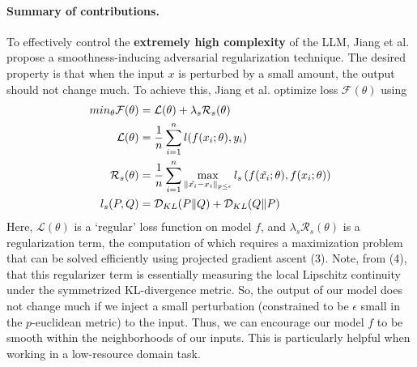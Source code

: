 \documentclass{article}
\begin{document}
\paragraph{Summary of contributions.}
To effectively control the \textbf{extremely high complexity} of the LLM, Jiang et al. \cite{smart} propose a smoothness-inducing adversarial regularization technique. The desired property is that when the input $x$ is perturbed by a small amount, the output should not change much. To achieve this, Jiang et al. \cite{smart} optimize loss $\mathcal{F}(\theta)$ using
\begin{align}
    min_{\theta} \mathcal{F}(\theta) & = \mathcal{L}(\theta) + \lambda_{s}\mathcal{R}_{s}(\theta) \\
    \mathcal{L}(\theta) & = \frac{1}{n} \sum_{i=1}^{n} l(f(x_{i};\theta), y_{i}) \\
    \mathcal{R}_{s}(\theta) & = \frac{1}{n} \sum_{i=1}^{n} \max_{\lVert \Tilde{x_{i}} - x_{i} \rVert_{p \leq \epsilon}} l_{s}\left(f(\Tilde{x_{i}}; \theta), f(x_{i}; \theta)\right) \\
    l_{s}(P, Q) & = \mathcal{D}_{KL}(P \lVert Q) + \mathcal{D}_{KL}(Q \lVert P)
\end{align}
Here, $\mathcal{L}(\theta)$ is a `regular' loss function on model $f$, and $\lambda_s \mathcal{R}_s(\theta)$ is a regularization term, the computation of which requires a maximization problem that can be solved efficiently using projected gradient ascent (3). Note, from (4), that this regularizer term is essentially measuring the local Lipschitz continuity under the symmetrized KL-divergence metric. So, the output of our model does not change much if we inject a small perturbation (constrained to be $\epsilon$ small in the $p$-euclidean metric) to the input. Thus, we can encourage our model $f$ to be smooth within the neighborhoods of our inputs. This is particularly helpful when working in a low-resource domain task. 
\end{document}
